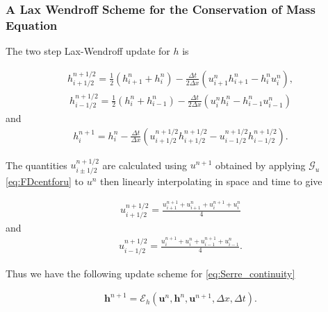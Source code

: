 \documentclass[SingleSpace,12pt,Proceedings]{Serre_ASCE}
\begin{document}
\subsubsection{A Lax Wendroff Scheme for the Conservation of Mass Equation}
\label{section:}
The two step Lax-Wendroff update for $h$ is
\begin{linenomath*}
	\begin{gather*}
	h^{n + 1/2}_{i+ 1/2} = \frac{1}{2}\left(h^{n}_{i+1} + h^{n}_i\right) - \frac{\Delta t}{2\Delta x}\left(u^n_{i+1}h^n_{i+1} - h^n_{i}u^n_{i}\right),
	\end{gather*}
	\begin{gather*}
	h^{n + 1/2}_{i- 1/2} = \frac{1}{2}\left(h^{n}_{i} + h^{n}_{i-1}\right) - \frac{\Delta t}{2\Delta x}\left(u^n_{i}h^n_{i} - h^n_{i-1}u^n_{i-1}\right)
	\end{gather*}
	and
	\begin{gather*}
	h^{n+1}_i = h^{n}_i - \frac{\Delta t}{\Delta x}\left(u^{n + 1/2}_{i+ 1/2}h^{n + 1/2}_{i+ 1/2} - u^{n + 1/2}_{i- 1/2}h^{n + 1/2}_{i- 1/2}\right).
	\label{eq:LW4h}
	\end{gather*}
\end{linenomath*}
The quantities $u^{n + 1/2}_{i \pm 1/2}$ are calculated using $u^{n+1}$ obtained by applying $\mathcal{G}_u$ \eqref{eq:FDcentforu} to $u^n$ then linearly interpolating in space and time to give
\begin{linenomath*}
	\begin{gather*}
	u^{n + 1/2}_{i+ 1/2} = \frac{u^{n+1}_{i+1} + u^{n}_{i+1} + u^{n+1}_{i} + u^{n}_{i} }{4}
	\end{gather*}
	and
	\begin{gather*}
	u^{n + 1/2}_{i- 1/2} = \frac{u^{n+1}_{i} + u^{n}_{i} + u^{n+1}_{i-1}+ u^{n}_{i-1} }{4}.
	\end{gather*}
\end{linenomath*}
Thus we have the following update scheme for \eqref{eq:Serre_continuity}
\begin{linenomath*}
	\begin{gather}
	\boldsymbol{h}^{n+1} = \mathcal{E}_h\left(\boldsymbol{u}^n,\boldsymbol{h}^n,\boldsymbol{u}^{n+1}, \Delta x, \Delta t \right). 
	\label{eq:LWupdateh}
	\end{gather}
\end{linenomath*}
\end{document}

